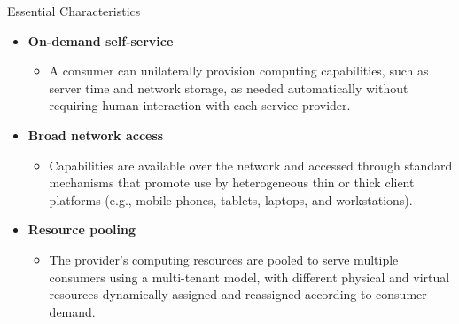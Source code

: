 \documentclass{SKP-beamer}
\begin{document}
\begin{frame}{ Essential Characteristics}
	\begin{itemize}
		
		\item  \textbf{On-demand self-service}
		\begin{itemize}
			
			\item A consumer can unilaterally provision computing capabilities, such as server time and network storage, as 
			needed automatically without requiring human interaction with each service provider.
			
		\end{itemize}
		\item \textbf{Broad network access}
		\begin{itemize}
			
			\item Capabilities are available over the network and accessed through standard mechanisms that promote use by 
			heterogeneous thin or thick client platforms (e.g., mobile phones, tablets, laptops, and workstations).
		\end{itemize}
		\item \textbf{Resource pooling}
		\begin{itemize}
			
			\item The provider’s computing resources are pooled to serve multiple consumers using a multi-tenant model, 
			with different physical and virtual resources dynamically assigned and reassigned according to consumer 
			demand.
			
		\end{itemize}
	\end{itemize}
\end{frame}
\end{document}
